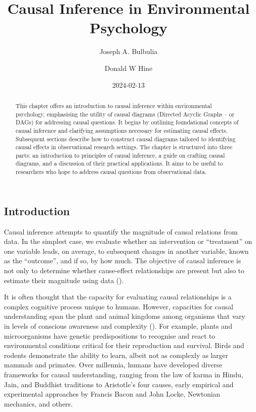 \documentclass[
  singlecolumn]{article}
\title{Causal Inference in Environmental Psychology}
\author{Joseph A. Bulbulia \and Donald W Hine}
\date{2024-02-13}
\begin{document}
\maketitle
\begin{abstract}
This chapter offers an introduction to causal inference within
environmental psychology, emphasising the utility of causal diagrams
(Directed Acyclic Graphs -- or DAGs) for addressing causal questions. It
begins by outlining foundational concepts of causal inference and
clarifying assumptions necessary for estimating causal effects.
Subsequent sections describe how to construct causal diagrams tailored
to identifying causal effects in observational research settings. The
chapter is structured into three parts: an introduction to principles of
causal inference, a guide on crafting causal diagrams, and a discussion
of their practical applications. It aims to be useful to researchers who
hope to address causal questions from observational data.
\end{abstract}

\subsection{Introduction}\label{introduction}

Causal inference attempts to quantify the magnitude of causal relations
from data. In the simplest case, we evaluate whether an intervention or
``treatment'' on one variable leads, on average, to subsequent changes
in another variable, known as the ``outcome'', and if so, by how much.
The objective of causal inference is not only to determine whether
cause-effect relationships are present but also to estimate their
magnitude using data ().

It is often thought that the capacity for evaluating causal
relationships is a complex cognitive process unique to humans. However,
capacities for causal understanding span the plant and animal kingdoms
among organisms that vary in levels of conscious awareness and
complexity (). For
example, plants and microorganisms have genetic predispositions to
recognise and react to environmental conditions critical for their
reproduction and survival. Birds and rodents demonstrate the ability to
learn, albeit not as complexly as larger mammals and primates. Over
millennia, humans have developed diverse frameworks for causal
understanding, ranging from the law of karma in Hindu, Jain, and
Buddhist traditions to Aristotle's four causes, early empirical and
experimental approaches by Francis Bacon and John Locke, Newtonian
mechanics, and others.
\end{document}
